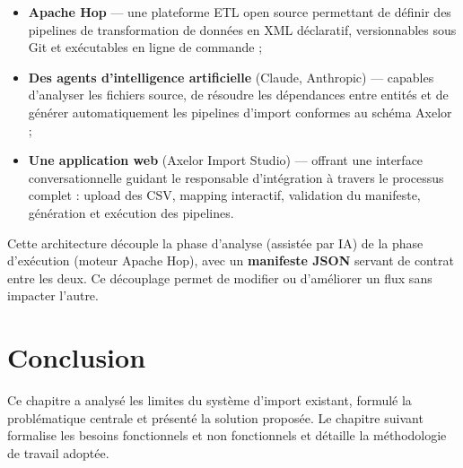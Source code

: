 \begin{itemize}
    \item \textbf{Apache Hop} — une plateforme ETL open source permettant de définir des pipelines de transformation de données en XML déclaratif, versionnables sous Git et exécutables en ligne de commande ;
    \item \textbf{Des agents d'intelligence artificielle} (Claude, Anthropic) — capables d'analyser les fichiers source, de résoudre les dépendances entre entités et de générer automatiquement les pipelines d'import conformes au schéma Axelor ;
    \item \textbf{Une application web} (Axelor Import Studio) — offrant une interface conversationnelle guidant le responsable d'intégration à travers le processus complet : upload des CSV, mapping interactif, validation du manifeste, génération et exécution des pipelines.
\end{itemize}

Cette architecture découple la phase d'analyse (assistée par IA) de la phase d'exécution (moteur Apache Hop), avec un \textbf{manifeste JSON} servant de contrat entre les deux. Ce découplage permet de modifier ou d'améliorer un flux sans impacter l'autre.

\section*{Conclusion}

Ce chapitre a analysé les limites du système d'import existant, formulé la problématique centrale et présenté la solution proposée. Le chapitre suivant formalise les besoins fonctionnels et non fonctionnels et détaille la méthodologie de travail adoptée.
